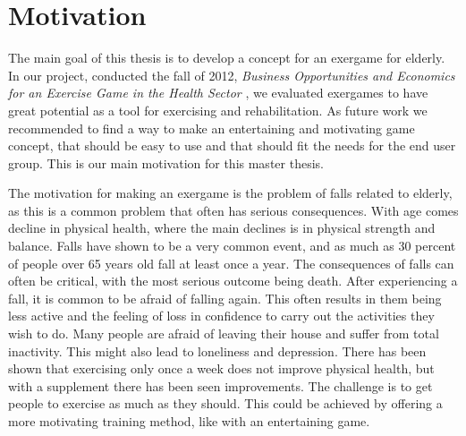 \chapter{Motivation}
\label{chap:background}

The main goal of this thesis is to develop a concept for an exergame for elderly. In our project, conducted the fall of 2012, \emph{Business Opportunities and Economics for an Exercise Game in the Health Sector} \cite{project}, we evaluated exergames to have great potential as a tool for exercising and rehabilitation. As future work we recommended to find a way to make an entertaining and motivating game concept, that should be easy to use and that should fit the needs for the end user group. This is our main motivation for this master thesis. 

The motivation for making an exergame is the problem of falls related to elderly, as this is a common problem that often has serious consequences. With age comes decline in physical health, where the main declines is in physical strength and balance. Falls have shown to be a very common event, and as much as 30 percent of people over 65 years old fall at least once a year. The consequences of falls can often be critical, with the most serious outcome being death. After experiencing a fall, it is common to be afraid of falling again. This often results in them being less active and the feeling of loss in confidence to carry out the activities they wish to do. Many people are afraid of leaving their house and suffer from total inactivity. This might also lead to loneliness and depression. There has been shown that exercising only once a week does not improve physical health, but with a supplement there has been seen improvements. The challenge is to get people to exercise as much as they should. This could be achieved by offering a more motivating training method, like with an entertaining game.

